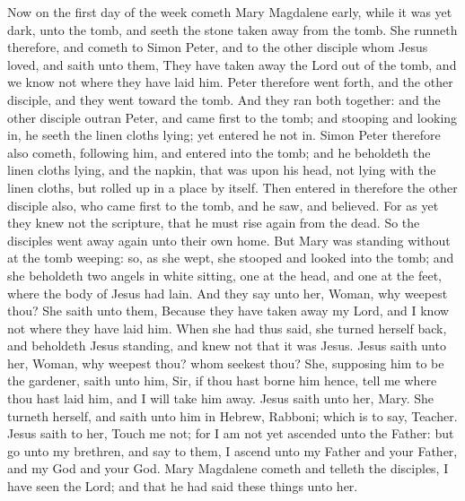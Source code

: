 Now on the first day of the week cometh Mary Magdalene early, while it was yet dark, unto the tomb, and seeth the stone taken away from the tomb. She runneth therefore, and cometh to Simon Peter, and to the other disciple whom Jesus loved, and saith unto them, They have taken away the Lord out of the tomb, and we know not where they have laid him. Peter therefore went forth, and the other disciple, and they went toward the tomb. And they ran both together: and the other disciple outran Peter, and came first to the tomb; and stooping and looking in, he seeth the linen cloths lying; yet entered he not in. Simon Peter therefore also cometh, following him, and entered into the tomb; and he beholdeth the linen cloths lying, and the napkin, that was upon his head, not lying with the linen cloths, but rolled up in a place by itself. Then entered in therefore the other disciple also, who came first to the tomb, and he saw, and believed. For as yet they knew not the scripture, that he must rise again from the dead. So the disciples went away again unto their own home.  But Mary was standing without at the tomb weeping: so, as she wept, she stooped and looked into the tomb; and she beholdeth two angels in white sitting, one at the head, and one at the feet, where the body of Jesus had lain. And they say unto her, Woman, why weepest thou? She saith unto them, Because they have taken away my Lord, and I know not where they have laid him. When she had thus said, she turned herself back, and beholdeth Jesus standing, and knew not that it was Jesus. Jesus saith unto her, Woman, why weepest thou? whom seekest thou? She, supposing him to be the gardener, saith unto him, Sir, if thou hast borne him hence, tell me where thou hast laid him, and I will take him away. Jesus saith unto her, Mary. She turneth herself, and saith unto him in Hebrew, Rabboni; which is to say, Teacher. Jesus saith to her, Touch me not; for I am not yet ascended unto the Father: but go unto my brethren, and say to them, I ascend unto my Father and your Father, and my God and your God. Mary Magdalene cometh and telleth the disciples, I have seen the Lord; and that he had said these things unto her.  

